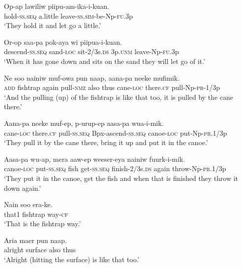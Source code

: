 \ea
\gll  Op-ap  lawiliw  piipu-am-ika-i-kuan. \\
hold-\textsc{ss.seq}  a.little  leave-\textsc{ss}.\textsc{sim}-be-Np-\textsc{fu}.3p \\
\glt ‘They hold it and let go a little.’ \\
\z


\ea
\gll  Or-op  saa-pa  pok-aya  wi  piipua-i-kuan. \\
descend-\textsc{ss.seq}  sand-\textsc{loc}  sit-2/3s.\textsc{ds}  3p.\textsc{unm}  leave-Np-\textsc{fu}.3p \\
\glt ‘When it has gone down and sits on the sand they will let go of it.’ \\
\z


\ea
\gll  Ne  soo  nainiw  muf-owa  pun  naap,  aana-pa  neeke  mufimik. \\
\textsc{add}  fishtrap  again  pull-\textsc{nmz}  also  thus  cane-\textsc{loc}  there.\textsc{cf}  pull-Np-\textsc{pr}-1/3p \\


\glt ‘And the pulling (up) of the fishtrap is like that too, it is pulled by the cane there.’ \\
\z


\ea
\gll  Aana-pa  neeke  muf-ep,  p-urup-ep               aasa-pa  wua-i-mik. \\
cane-\textsc{loc}  there.\textsc{cf}  pull-\textsc{ss.seq}  Bpx-ascend-\textsc{ss.seq}     canoe-\textsc{loc}  put-Np-\textsc{pr}.1/3p \\


\glt ‘They pull it by the cane there, bring it up and put it in the canoe.’ \\
\z


\ea
\gll  Aasa-pa  wu-ap,  mera  aaw-ep  weeser-eya           nainiw  fuurk-i-mik. \\
canoe-\textsc{loc}  put-\textsc{ss.seq}  fish  get-\textsc{ss.seq}  finish-2/3s.\textsc{ds}   again  throw-Np-\textsc{pr}.1/3p \\


\glt ‘They put it in the canoe, get the fish and when that is finished they throw it down again.’ \\
\z


\ea
\gll  Nain  soo  era-ke. \\
that1  fishtrap  way-\textsc{cf} \\
\glt ‘That is the fishtrap way.’ \\
\z


\ea
\gll  Aria  maer  pun  naap. \\
alright  surface  also  thus \\
\glt ‘Alright (hitting the surface) is like that too.’ \\
\z


